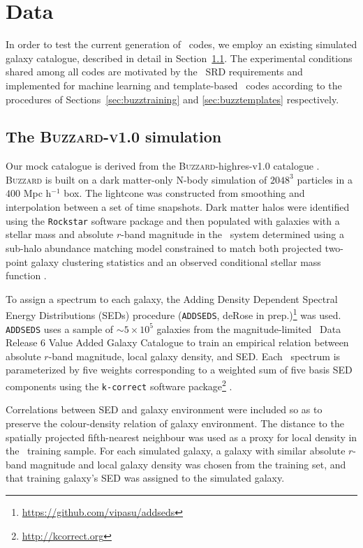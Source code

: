 \section{Data}
\label{sec:sims}

In order to test the current generation of \pzpdf\ codes, we employ an existing simulated galaxy catalogue, described in detail in Section~\ref{sec:buzzard}.
The experimental conditions shared among all codes are motivated by the \lsst\ SRD requirements and implemented for machine learning and template-based \pzpdf\ codes according to the procedures of Sections~\ref{sec:buzztraining} and \ref{sec:buzztemplates} respectively.

\subsection{The \textsc{Buzzard-v1.0} simulation}
\label{sec:buzzard}

Our mock catalogue is derived from the \textsc{Buzzard}-highres-v1.0 catalogue  \citep[][Wechsler et al., in prep]{DeRose:19}.
\textsc{Buzzard} is built on a dark matter-only N-body simulation of $2048^{3}$ particles in a $400$ Mpc h$^{-1}$ box.
The lightcone was constructed from smoothing and interpolation between a set of time snapshots.
Dark matter halos were identified using the \texttt{Rockstar} software package \citep{Behroozi:13} and then populated with galaxies with a stellar mass and absolute $r$-band magnitude in the \sdss\ system determined using a sub-halo abundance matching model constrained to match both projected two-point galaxy clustering statistics and an observed conditional stellar mass function \citep{Reddick:13}.

To assign a spectrum to each galaxy, the Adding Density Dependent Spectral Energy Distributions (SEDs) procedure (\texttt{ADDSEDS}, deRose in prep.)\footnote{\url{https://github.com/vipasu/addseds}} was used.
\texttt{ADDSEDS} uses a sample of $\sim 5\times 10^{5}$ galaxies from the magnitude-limited \sdss\ Data Release 6 Value Added Galaxy Catalogue \citep{Blanton:05} to train an empirical relation between absolute $r$-band magnitude, local galaxy density, and SED.
Each \sdss\ spectrum is parameterized by five weights corresponding to a weighted sum of five basis SED components using the \texttt{k-correct} software package\footnote{\url{http://kcorrect.org}} \citep{Blanton:07}.

Correlations between SED and galaxy environment were included so as to preserve the colour-density relation of galaxy environment.
The distance to the spatially projected fifth-nearest neighbour was used as a proxy for local density in the \sdss\ training sample.
For each simulated galaxy, a galaxy with similar absolute $r$-band magnitude and local galaxy density was chosen from the training set, and that training galaxy's SED was assigned to the simulated galaxy.

